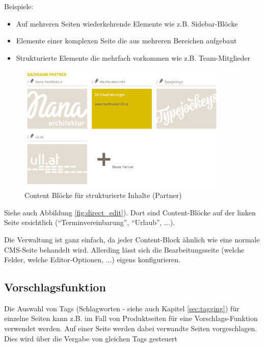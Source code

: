 \documentclass[article, a4paper, oneside, 11pt]{memoir}
\begin{document}
Beispiele:

\begin{itemize}
\item Auf mehreren Seiten wiederkehrende Elemente wie z.B. Sidebar-Blöcke
\item Elemente einer komplexen Seite die aus mehreren Bereichen aufgebaut
\item Strukturierte Elemente die mehrfach vorkommen wie z.B. Team-Mitglieder
\end{itemize}

\begin{figure}[htp]
\centering
\includegraphics[width=0.9\textwidth]{content_block_show}
\caption{Content Blöcke für strukturierte Inhalte (Partner)}
\label{fig:content_block_show}
\end{figure}

Siehe auch Abbildung \vref{fig:direct_edit}). Dort sind Content-Blöcke auf der linken Seite ersichtlich ("`Terminvereinbarung"', "`Urlaub"', ...).

Die Verwaltung ist ganz einfach, da jeder Content-Block ähnlich wie eine normale CMS-Seite behandelt wird.
Allerding lässt sich die Bearbeitungsseite (welche Felder, welche Editor-Optionen, ...) eigens konfigurieren.



\subsection{Vorschlagsfunktion}
\label{sec:recommendation}

Die Auswahl von Tags (Schlagworten - siehe auch Kapitel \vref{sec:tagging}) für einzelne Seiten kann z.B. im Fall von Produktseiten für eine Vorschlags-Funktion verwendet werden. Auf einer Seite werden dabei verwandte Seiten vorgeschlagen. Dies wird über die Vergabe von gleichen Tags gesteuert
\end{document}
